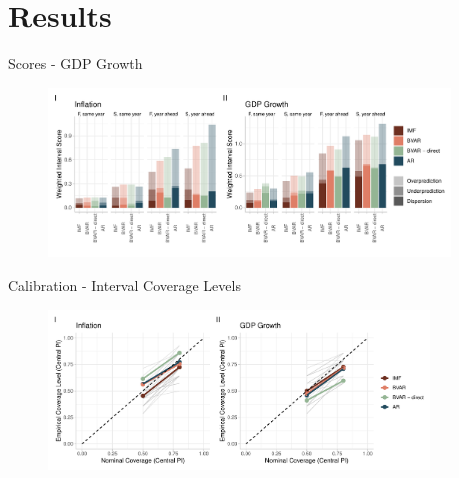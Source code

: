 \documentclass[en]{sdqbeamer}
\begin{document}
\section{Results}
\begin{frame}{Scores - GDP Growth}
    \begin{figure}
        \centering
        \includegraphics[width=0.95\textwidth]{figures/wis_cpigdp_new.pdf} 
        \label{fig:enter-label}
    \end{figure} 
\end{frame}



\begin{frame}{Calibration - Interval Coverage Levels}
    \begin{figure}
        \centering
        \includegraphics[width=0.9\textwidth]{figures/coverage.pdf}
        \label{fig:enter-label}
    \end{figure}
\end{frame}
\end{document}
